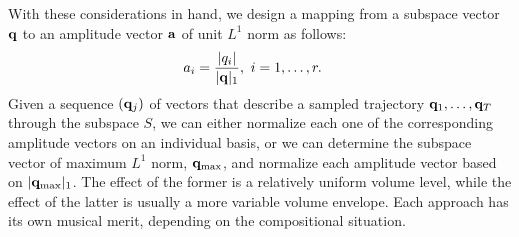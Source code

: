 \documentclass[11pt]{article}
\begin{document}
With these considerations in hand, we design a mapping from a subspace vector $\mathbf{q}$ to an amplitude vector $\mathbf{a}$ of unit $L^1$ norm as follows:
\begin{equation}
\begin{aligned}
a_i &= \frac{\lvert q_i \rvert}{\lvert\mathbf{q}\rvert_1}, \ i = 1, \ldots, r.
\end{aligned}
\end{equation}
Given a sequence $(\mathbf{q}_j)$ of vectors that describe a sampled trajectory $\mathbf{q}_1, \ldots, \mathbf{q}_T$ through the subspace $S$, we can either normalize each one of the corresponding amplitude vectors on an individual basis, or we can determine the subspace vector of maximum $L^1$ norm, $\mathbf{q}_{\textnormal{max}}$, and normalize each amplitude vector based on $\lvert\mathbf{q}_{\textnormal{max}}\rvert_1$. The effect of the former is a relatively uniform volume level, while the effect of the latter is usually a more variable volume envelope. Each approach has its own musical merit, depending on the compositional situation.
\end{document}
